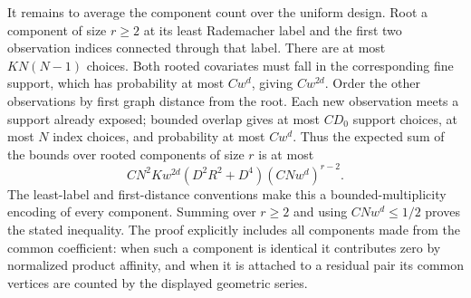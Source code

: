 It remains to average the component count over the uniform design. Root a component of size \(r\ge2\) at its least Rademacher label and the first two observation indices connected through that label. There are at most \(K N(N-1)\) choices. Both rooted covariates must fall in the corresponding fine support, which has probability at most \(Cw^d\), giving \(Cw^{2d}\). Order the other observations by first graph distance from the root. Each new observation meets a support already exposed; bounded overlap gives at most \(CD_0\) support choices, at most \(N\) index choices, and probability at most \(Cw^d\). Thus the expected sum of the bounds over rooted components of size \(r\) is at most
\[
CN^2Kw^{2d}(D^2R^2+D^4)(CNw^d)^{r-2}.
\]
The least-label and first-distance conventions make this a bounded-multiplicity encoding of every component. Summing over \(r\ge2\) and using \(CNw^d\le1/2\) proves the stated inequality. The proof explicitly includes all components made from the common coefficient: when such a component is identical it contributes zero by normalized product affinity, and when it is attached to a residual pair its common vertices are counted by the displayed geometric series.